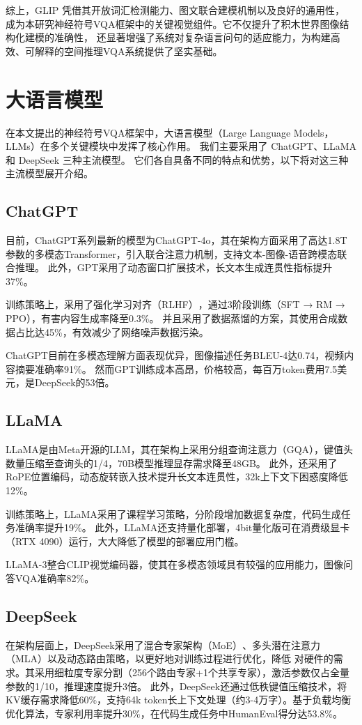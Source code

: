 综上，GLIP 凭借其开放词汇检测能力、图文联合建模机制以及良好的通用性，
成为本研究神经符号VQA框架中的关键视觉组件。它不仅提升了积木世界图像结构化建模的准确性，
还显著增强了系统对复杂语言问句的适应能力，为构建高效、可解释的空间推理VQA系统提供了坚实基础。
\section{大语言模型}
在本文提出的神经符号VQA框架中，大语言模型（Large Language Models， LLMs）在多个关键模块中发挥了核心作用。
我们主要采用了 ChatGPT、LLaMA 和 DeepSeek 三种主流模型。
它们各自具备不同的特点和优势，以下将对这三种主流模型展开介绍。
\subsection{ChatGPT}
目前，ChatGPT系列最新的模型为ChatGPT-4o，其在架构方面采用了高达1.8T参数的多模态Transformer，引入联合注意力机制，支持文本-图像-语音跨模态联合推理。
此外，GPT采用了动态窗口扩展技术，长文本生成连贯性指标提升37\%。

训练策略上，采用了强化学习对齐（RLHF）​，通过3阶段训练（SFT → RM → PPO），有害内容生成率降至0.3\%。
并且采用了​数据蒸馏的方案，其使用合成数据占比达45\%，有效减少了网络噪声数据污染。

ChatGPT目前在​多模态理解方面表现优异，图像描述任务BLEU-4达0.74，视频内容摘要准确率91\%。
然而GPT训练成本高昂，价格较高，每百万token费用7.5美元，是DeepSeek的53倍。
\subsection{LLaMA}
LLaMA是由Meta开源的LLM，其在架构上采用分组查询注意力（GQA），​键值头数量压缩至查询头的1/4，70B模型推理显存需求降至48GB。
此外，还采用了RoPE位置编码，动态旋转嵌入技术提升长文本连贯性，32k上下文下困惑度降低12\%。

训练策略上，LLaMA采用了课程学习策略，分阶段增加数据复杂度，代码生成任务准确率提升19\%。
此外，LLaMA还支持量化部署，4bit量化版可在消费级显卡（RTX 4090）运行，大大降低了模型的部署应用门槛。

LLaMA-3整合CLIP视觉编码器，使其在多模态领域具有较强的应用能力，图像问答VQA准确率82\%。
\subsection{DeepSeek}
在架构层面上，DeepSeek采用了混合专家架构（MoE）​、多头潜在注意力（MLA）以及动态路由策略，以更好地对训练过程进行优化，降低
对硬件的需求。其采用细粒度专家分割（256个路由专家+1个共享专家），激活参数仅占全量参数的1/10，推理速度提升3倍。
此外，DeepSeek还通过低秩键值压缩技术，将KV缓存需求降低60\%，支持64k token长上下文处理（约3-4万字）。基于负载均衡优化算法，专家利用率提升30\%，在代码生成任务中HumanEval得分达53.8\%。

